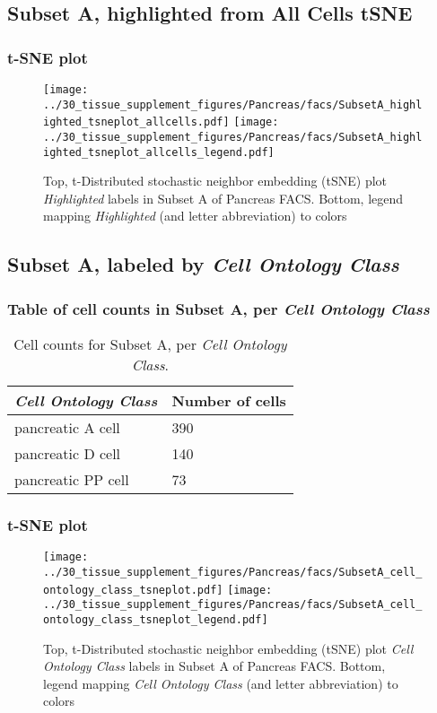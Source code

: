 \clearpage
\subsection{Subset A, highlighted from All Cells tSNE}
\subsubsection{t-SNE plot}
\begin{figure}[h]
\centering
\texttt{[image: ../30\_tissue\_supplement\_figures/Pancreas/facs/SubsetA\_highlighted\_tsneplot\_allcells.pdf]}
\texttt{[image: ../30\_tissue\_supplement\_figures/Pancreas/facs/SubsetA\_highlighted\_tsneplot\_allcells\_legend.pdf]}
\caption{Top, t-Distributed stochastic neighbor embedding (tSNE) plot  \emph{Highlighted} labels in Subset A of Pancreas FACS. Bottom, legend mapping \emph{Highlighted} (and letter abbreviation) to colors}
\end{figure}


\clearpage

\subsection{Subset A, labeled by \emph{Cell Ontology Class}}
\subsubsection{Table of cell counts in Subset A, per \emph{Cell Ontology Class}}\begin{table}[h]
\centering
\label{my-label}
\begin{tabular}{@{}ll@{}}
\toprule

\emph{Cell Ontology Class}& Number of cells \\ \midrule
pancreatic A cell & 390 \\

pancreatic D cell & 140 \\

pancreatic PP cell & 73 \\
\bottomrule
\end{tabular}
\caption{Cell counts for Subset A, per \emph{Cell Ontology Class}.}
\end{table}

\clearpage
\subsubsection{t-SNE plot}
\begin{figure}[h]
\centering
\texttt{[image: ../30\_tissue\_supplement\_figures/Pancreas/facs/SubsetA\_cell\_ontology\_class\_tsneplot.pdf]}
\texttt{[image: ../30\_tissue\_supplement\_figures/Pancreas/facs/SubsetA\_cell\_ontology\_class\_tsneplot\_legend.pdf]}
\caption{Top, t-Distributed stochastic neighbor embedding (tSNE) plot  \emph{Cell Ontology Class} labels in Subset A of Pancreas FACS. Bottom, legend mapping \emph{Cell Ontology Class} (and letter abbreviation) to colors}
\end{figure}


